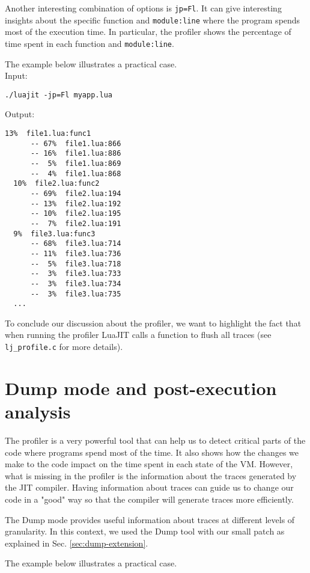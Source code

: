 Another interesting combination of options is \texttt{jp=Fl}. It can give interesting insights about the specific function and \texttt{module:line} where the program spends most of the execution time. In particular, the profiler shows the percentage of time spent in each function and \texttt{module:line}.

The example below illustrates a practical case.\\

\noindent
Input:
\begin{lstlisting}[style=CommandsLuaJIT]
  ./luajit -jp=Fl myapp.lua
\end{lstlisting}

\noindent
Output:
\begin{lstlisting}[style=CommandsLuaJIT]
  13%  file1.lua:func1
	  -- 67%  file1.lua:866
	  -- 16%  file1.lua:886
	  --  5%  file1.lua:869
	  --  4%  file1.lua:868
  10%  file2.lua:func2
	  -- 69%  file2.lua:194
	  -- 13%  file2.lua:192
	  -- 10%  file2.lua:195
	  --  7%  file2.lua:191
  9%  file3.lua:func3
	  -- 68%  file3.lua:714
	  -- 11%  file3.lua:736
	  --  5%  file3.lua:718
	  --  3%  file3.lua:733
	  --  3%  file3.lua:734
	  --  3%  file3.lua:735
  ...
\end{lstlisting}

\noindent
To conclude our discussion about the profiler, we want to highlight the fact that when running the profiler LuaJIT calls a function to flush all traces (see \texttt{lj\_profile.c} for more details).


\section{Dump mode and post-execution analysis}
The profiler is a very powerful tool that can help us to detect critical parts of the code where programs spend most of the time. It also shows how the changes we make to the code impact on the time spent in each state of the VM. However, what is missing in the profiler is the information about the traces generated by the JIT compiler. Having information about traces can guide us to change our code in a "good" way so that the compiler will generate traces more efficiently. 

The Dump mode provides useful information about traces at different levels of granularity. In this context, we used the Dump tool with our small patch as explained in Sec. \ref{sec:dump-extension}. 

The example below illustrates a practical case.\\

